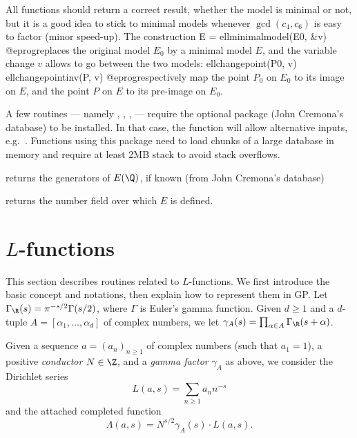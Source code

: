 
All functions should return a correct result, whether the model is minimal or
not, but it is a good idea to stick to minimal models whenever
$\gcd(c_4,c_6)$ is easy to factor (minor speed-up). The construction
\bprog
  E = ellminimalmodel(E0, &v)
@eprog\noindent replaces the original model $E_0$ by a minimal model $E$,
and the variable change $v$ allows to go between the two models:
\bprog
  ellchangepoint(P0, v)
  ellchangepointinv(P, v)
@eprog\noindent respectively map the point $P_0$ on $E_0$ to its image on
$E$, and the point $P$ on $E$ to its pre-image on $E_0$.

A few routines --- namely , ,
,  --- require the optional package 
(John Cremona's database) to be installed. In that case, the function
 will allow alternative inputs, e.g.~.
Functions using this package need to load chunks of a large database in
memory and require at least 2MB stack to avoid stack overflows.

\item {} returns the generators of $E(\Q)$, if known (from John
  Cremona's database)


\item {} returns the number field over which $E$ is defined.


\section{$L$-functions}

This section describes routines related to $L$-functions. We first introduce
the basic concept and notations, then explain how to represent them in GP.
Let $\Gamma_\R(s) = \pi^{-s/2}\Gamma(s/2)$, where $\Gamma$ is Euler's gamma
function. Given $d \geq 1$ and a $d$-tuple $A=[\alpha_1,\dots,\alpha_d]$ of
complex numbers, we let $\gamma_A(s) = \prod_{\alpha \in A} \Gamma_\R(s +
\alpha)$.

Given a sequence $a = (a_n)_{n\geq 1}$ of complex numbers (such that $a_1 = 1$),
a positive \emph{conductor} $N \in \Z$, and a \emph{gamma factor}
$\gamma_A$ as above, we consider the Dirichlet series
$$ L(a,s) = \sum_{n\geq 1} a_n n^{-s} $$
and the attached completed function
$$ \Lambda(a,s) = N^{s/2}\gamma_A(s) \cdot L(a,s). $$

